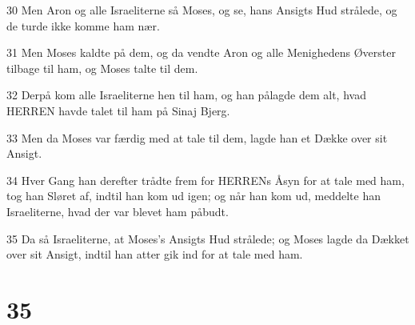 \par 30 Men Aron og alle Israeliterne så Moses, og se, hans Ansigts Hud strålede, og de turde ikke komme ham nær.
\par 31 Men Moses kaldte på dem, og da vendte Aron og alle Menighedens Øverster tilbage til ham, og Moses talte til dem.
\par 32 Derpå kom alle Israeliterne hen til ham, og han pålagde dem alt, hvad HERREN havde talet til ham på Sinaj Bjerg.
\par 33 Men da Moses var færdig med at tale til dem, lagde han et Dække over sit Ansigt.
\par 34 Hver Gang han derefter trådte frem for HERRENs Åsyn for at tale med ham, tog han Sløret af, indtil han kom ud igen; og når han kom ud, meddelte han Israeliterne, hvad der var blevet ham påbudt.
\par 35 Da så Israeliterne, at Moses's Ansigts Hud strålede; og Moses lagde da Dækket over sit Ansigt, indtil han atter gik ind for at tale med ham.

\chapter{35}

